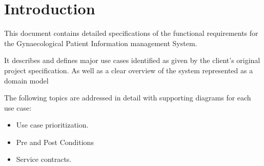 \section{Introduction}

This document contains detailed specifications of the functional requirements for the Gynaecological Patient Information
management System. \bigskip

It describes and defines major use cases identified as given by the client's original project specification. As well as a clear overview of the system represented as a domain model \bigskip

The following topics are addressed in detail with supporting diagrams for each use case:

\begin{itemize}
	\item Use case prioritization.
	\item Pre and Post Conditions
	\item Service contracts.
\end{itemize}